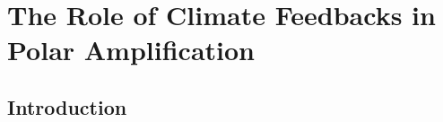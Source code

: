 \chapter{The Role of Climate Feedbacks in Polar Amplification}
\label{ch:polaramplification}


\section{Introduction}




